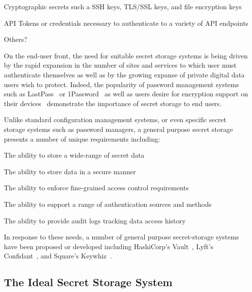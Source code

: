 \begin{packed_item}
\item Cryptographic secrets such a SSH keys, TLS/SSL keys, and file
  encryption keys
\item API Tokens or credentials necessary to authenticate to a variety of
  API endpoints
\item Others?
\end{packed_item}

On the end-user front, the need for suitable secret storage systems is
being driven by the rapid expansion in the number of sites and
services to which user must authenticate themselves as well as by the
growing expanse of private digital data users wish to protect. Indeed,
the popularity of password management systems such as
LastPass~\cite{lastpass} or 1Password~\cite{onepassword} as well as
users desire for encryption support on their
devices~\cite{intercept-cookencryption} demonstrate the importance of
secret storage to end users.

Unlike standard configuration management systems, or even specific
secret storage systems such as password managers, a general purpose
secret storage presents a number of unique requirements including:

\begin{packed_item}
\item The ability to store a wide-range of secret data
\item The ability to store data in a secure manner
\item The ability to enforce fine-grained access control requirements
\item The ability to support a range of authentication sources and methods
\item The ability to provide audit logs tracking data access history
\end{packed_item}

In response to these needs, a number of general purpose secret-storage
systems have been proposed or developed including HashiCorp's
Vault~\cite{vault}, Lyft's Confidant~\cite{confidant}, and Square's
Keywhiz~\cite{keywhiz}.

\subsection{The Ideal Secret Storage System}



